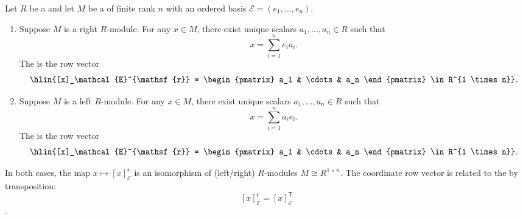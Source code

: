 \begin{definition} \label{definition:coordinate_row_vector_of_an_element_of_a_free_module_with_respect_to_a_basis}
    Let $R$ be a  and let $M$ be a  of finite rank $n$ with an ordered basis $\mathcal{E} = (e_1,\ldots,e_n)$.

    \begin{enumerate}
        \item Suppose $M$ is a right $R$-module. For any $x \in M$, there exist unique scalars $a_1,\ldots,a_n \in R$ such that
        $$x = \sum_{i=1}^n e_i a_i.$$
        The  is the row vector
        $$\hlin{[x]_\mathcal{E}^{\mathsf{r}} = \begin{pmatrix} a_1 & \cdots & a_n \end{pmatrix} \in R^{1 \times n}}.$$

        \item Suppose $M$ is a left $R$-module. For any $x \in M$, there exist unique scalars $a_1,\ldots,a_n \in R$ such that
        $$x = \sum_{i=1}^n a_i e_i.$$
        The  is the row vector
        $$\hlin{[x]_\mathcal{E}^{\mathsf{r}} = \begin{pmatrix} a_1 & \cdots & a_n \end{pmatrix} \in R^{1 \times n}}.$$
    \end{enumerate}

    In both cases, the map $x \mapsto [x]_\mathcal{E}^{\mathsf{r}}$ is an isomorphism of (left/right) $R$-modules $M \cong R^{1 \times n}$. The coordinate row vector is related to the  by transposition:
    $$[x]_\mathcal{E}^{\mathsf{r}} = [x]_\mathcal{E}^{\mathsf{T}}$$
    .
\end{definition}